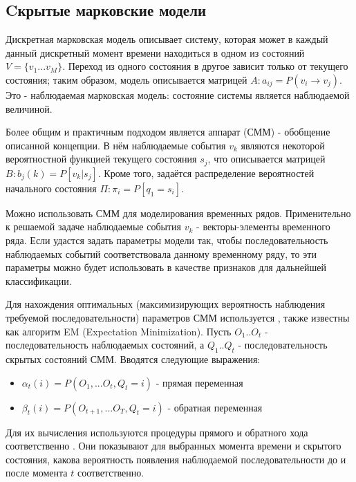 \subsection{Cкрытые марковские модели}

Дискретная марковская модель описывает систему, которая может в каждый данный дискретный момент времени находиться в одном из состояний $V=\{v_1...v_M\}$. Переход из одного состояния в другое зависит только от текущего состояния; таким образом, модель описывается матрицей $A: a_{ij}=P(v_i \to v_j)$. Это - наблюдаемая марковская модель: состояние системы является наблюдаемой величиной. 

Более общим и практичным подходом является аппарат  (СММ) - обобщение описанной концепции. В нём наблюдаемые события $v_k$ являются некоторой вероятностной функцией текущего состояния $s_j$, что описывается матрицей $B: b_j(k)=P[v_k | s_j]$. Кроме того, задаётся распределение вероятностей начального состояния $\Pi: \pi_i=P[q_1=s_i]$. 

Можно использовать СММ для моделирования временных рядов. Применительно к решаемой задаче наблюдаемые события $v_k$ - векторы-элементы временного ряда. Если удастся задать параметры модели так, чтобы последовательность наблюдаемых событий соответствовала данному временному ряду, то эти параметры можно будет использовать в качестве признаков для дальнейшей классификации.

Для нахождения оптимальных (максимизирующих вероятность наблюдения требуемой последовательности) параметров СММ используется , также известны как алгоритм EM (Expectation Minimization). Пусть $O_1..O_t$ - последовательность наблюдаемых состояний, а $Q_1..Q_t$ - последовательность скрытых состояний СММ. Вводятся следующие выражения:
\begin{itemize}
\item $\alpha_t(i)=P(O_1, ... O_t , Q_t=i)$ - прямая переменная
\item $\beta_t(i)=P(O_{t+1}, ... O_T , Q_t=i)$ - обратная переменная
\end{itemize}
Для их вычисления используются процедуры прямого и обратного хода соответственно \cite{hmm_review}. Они показывают для выбранных момента времени и скрытого состояния, какова вероятность появления наблюдаемой последовательности до и после момента $t$ соответственно. 

